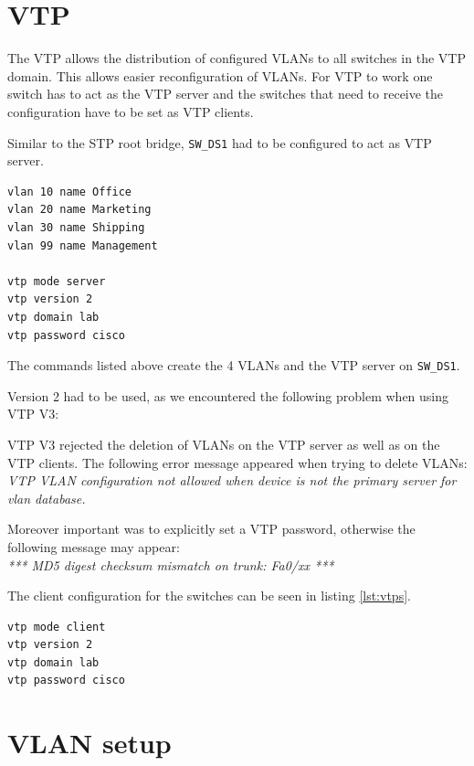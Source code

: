 \chapter{VTP}

The \ac{VTP} allows the distribution of configured \ac{VLAN}s to all switches in the VTP domain. This allows easier reconfiguration of VLANs. For VTP to work one switch has to act as the VTP server and the switches that need to receive the configuration have to be set as VTP clients.

Similar to the STP root bridge, \texttt{SW\_DS1} had to be configured to act as \ac{VTP} server.

\begin{lstlisting}[caption={\ac{VTP} and VLAN},label={lst:vtps},language={}]
vlan 10 name Office
vlan 20 name Marketing
vlan 30 name Shipping
vlan 99 name Management

vtp mode server
vtp version 2
vtp domain lab
vtp password cisco
\end{lstlisting}

The commands listed above create the 4 \acp{VLAN} and the \ac{VTP} server on \texttt{SW\_DS1}.

Version 2 had to be used, as we encountered the following problem when using VTP V3:

VTP V3 rejected the deletion of \acp{VLAN} on the VTP server as well as on the VTP clients. The following error message appeared when trying to delete VLANs: \\
\textit{VTP VLAN configuration not allowed when device is not the primary server for vlan database.}

Moreover important was to explicitly set a VTP password, otherwise the following message may appear: \\
\textit{*** MD5 digest checksum mismatch on trunk: Fa0/xx ***}

The client configuration for the switches can be seen in listing \ref{lst:vtps}.

\begin{lstlisting}[caption={\ac{VTP} client},label={lst:vtps},language={}]
vtp mode client
vtp version 2
vtp domain lab
vtp password cisco
\end{lstlisting}

\chapter{\ac{VLAN} setup}

